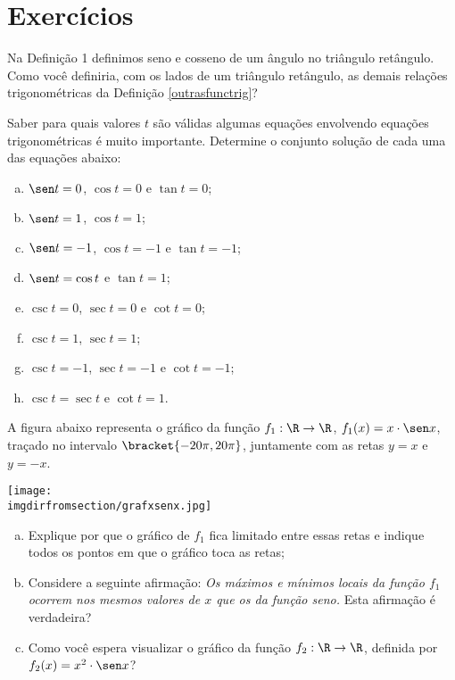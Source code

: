 \section{Exercícios}

\begin{exercise}
    Na Definição 1 definimos seno e cosseno de um ângulo no
triângulo retângulo. Como você definiria, com os lados de um
triângulo retângulo, as demais relações trigonométricas da Definição
\ref{outrasfunctrig}? %
\end{exercise}

\begin{exercise}
Saber para quais valores $t$ são válidas algumas equações
envolvendo equações trigonométricas é muito importante. Determine o
conjunto solução de cada uma das equações abaixo:
\begin{enumerate}[(a)]
  \item $\sen t = 0$, $\cos t = 0$ e $\tan t = 0$;
  \item $\sen t = 1$, $\cos t = 1$;
  \item $\sen t = -1$, $\cos t = -1$ e $\tan t = -1$;
  \item $\sen t = \cos t$ e $\tan t = 1$;
  \item $\csc t = 0$, $\sec t = 0$ e $\cot t = 0$;
  \item $\csc t = 1$, $\sec t = 1$;
  \item $\csc t = -1$, $\sec t = -1$ e $\cot t = -1$;
  \item $\csc t = \sec t$ e $\cot t = 1$.
\end{enumerate}
\end{exercise}

\begin{exercise}
    A figura abaixo representa o gráfico da função $f_1 : \R \to
\R$, $f_1(x) = x \cdot \sen x$, traçado no intervalo $\bracket{-20 \pi,
20 \pi}$, juntamente com as retas $y=x$ e $y=-x$.
\begin{center}
\texttt{[image: \\imgdirfromsection/grafxsenx.jpg]}
\end{center}
\begin{enumerate}[(a)]
  \item Explique por que o gráfico de $f_1$ fica limitado entre
  essas retas e indique todos os pontos em que o gráfico toca as retas;
  \item Considere a seguinte afirmação: \emph{Os máximos e
  mínimos locais da função $f_1$ ocorrem nos mesmos valores
  de $x$ que os da função seno.} Esta afirmação é verdadeira?
  \item Como você espera visualizar o gráfico da função $f_2: \R \to
  \R$, definida por $f_2(x) = x^2 \cdot \sen x$?
\end{enumerate}
\end{exercise}

